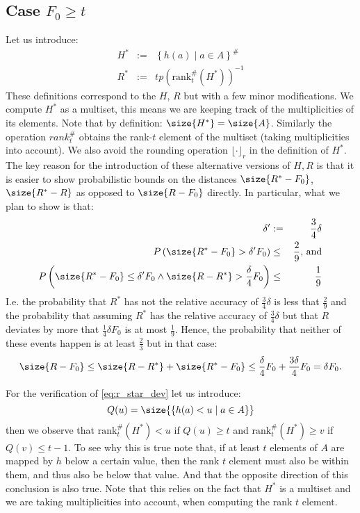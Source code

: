 \documentclass[11pt,a4paper]{article}
\begin{document}
\subsection{Case $F_0 \geq t$}
Let us introduce:
\begin{eqnarray*}
    H^* & := & \left\{ h(a) \middle \vert a \in A \right\}^{\#} \\
    R^* & := & tp \left( \mathrm{rank}^{\#}_t(H^*) \right)^{-1}
\end{eqnarray*}
These definitions correspond to the $H$, $R$ but with a few minor modifications.
We compute $H^*$ as a multiset, this means we are keeping track of the multiplicities of its elements.
Note that by definition: $\size{H^*}=\size{A}$.
Similarly the operation $rank^{\#}_t$ obtains the rank-$t$ element of the multiset (taking multiplicities into account).
We also avoid the rounding operation $\lfloor \cdot \rfloor_r$ in the definition of $H^*$.
The key reason for the introduction of these alternative versions of $H, R$ is that it is easier to show probabilistic bounds on the distances $\size{R^* - F_0}$, 
$\size{R^* - R}$ as opposed to $\size{R - F_0}$ directly.
In particular, what we plan to show is that:
\begin{eqnarray}
 \delta' & := & \frac{3}{4}\delta \\
 P\left(\size{R^*-F_0} > \delta' F_0\right) & \leq & \frac{2}{9} \textrm{, and} \label{eq:r_star_dev} \\
 P\left(\size{R^*-F_0} \leq \delta' F_0 \wedge \size{R-R^*} > \frac{\delta}{4} F_0\right) & \leq & \frac{1}{9} \label{eq:r_star_r}
\end{eqnarray}
I.e. the probability that $R^*$ has not the relative accuracy of $\frac{3}{4}\delta$ is less that $\frac{2}{9}$ and the probability 
that assuming $R^*$ has the relative accuracy of $\frac{3}{4}\delta$ but that $R$ deviates by more that $\frac{1}{4}\delta F_0$ is at most $\frac{1}{9}$.
Hence, the probability that neither of these events happen is at least $\frac{2}{3}$ but in that case:
\begin{equation}
    \label{eq:concl}
    \size{R-F_0} \leq \size{R - R^*} + \size{R^*-F_0} \leq \frac{\delta}{4} F_0 + \frac{3 \delta}{4} F_0 = \delta F_0 \textrm{.}
\end{equation}

For the verification of \autoref{eq:r_star_dev} let us introduce:
\[
    Q(u) = \size{\left\{h(a) < u \mid a \in A \right\}}
\]
then we observe that $\mathrm{rank}_t^{\#}(H^*) < u$ if $Q(u) \geq t$ and $\mathrm{rank}_t^{\#}(H^*) \geq v$ if $Q(v) \leq t-1$.
To see why this is true note that, if at least $t$ elements of $A$ are mapped by $h$ below a certain value, then the rank $t$ element must also be within them, and thus also be below that value.
And that the opposite direction of this conclusion is also true.
Note that this relies on the fact that $H^*$ is a multiset and we are taking multiplicities into account, when computing the rank $t$ element. 
\end{document}
